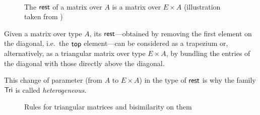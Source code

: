\documentclass[a4paper,USenglish]{lipics}
\begin{document}
\begin{ex}
\begin{Long}
\begin{figure}[hbt]
\\[-2ex]
  \caption{The $\mathsf{rest}$ of a matrix over $A$ is a matrix over $E\times A$ (illustration taken from \parencite{DBLP:conf/types/MatthesP11})}
  \label{fig:tri_trap}
\end{figure}
\end{Long}
\begin{Short}
 Given a matrix over type $A$, its $\mathsf{rest}$---obtained by removing the first element on the diagonal, i.e.\ the $\mathsf{top}$ element---can 
 be considered as a trapezium or, alternatively, as a triangular matrix over type $E\times A$, 
 by bundling the entries of the diagonal with those directly above the diagonal. 
\end{Short}
This change of parameter (from $A$ to $E \times A$) in the type of $\mathsf{rest}$ is why the family $\mathsf{Tri}$ is called \emph{heterogeneous}.

 
 \begin{figure}
 \begin{mdframed}
  
 \end{mdframed}
 \caption{Rules for triangular matrices and bisimilarity on them} \label{tri_rules}
\end{figure}
 

\begin{comment}
\begin{figure}[bt]
  \centering

     \def\extraVskip{3pt}
     \def\proofSkipAmount{\vskip.8ex plus.8ex minus.4ex}
    \AxiomC{$t : \Tri~A$} %
     \UnaryInfC{$\head_A~t : A$}
      \DisplayProof
                        \hspace{3ex}
                                       \AxiomC{$t : \Tri~A$}%
                                       \UnaryInfC{$\tail_A~t : \Tri(E\times A)$}
                                       \DisplayProof%
% 
% 
% 
 \hspace{3ex}
                                            \def\extraVskip{3pt}
     \def\proofSkipAmount{\vskip.8ex plus.8ex minus.4ex}
    \AxiomC{$t \sim t'$}%
     \UnaryInfC{$\head~t = \head~t'$}
      \DisplayProof
                        \hspace{3ex}
                                       \AxiomC{$t \sim t'$}%
                                       \UnaryInfC{$ \tail~t \sim \tail~t'$}
                                       \DisplayProof   


\end{comment}
\end{ex}
\end{document}
